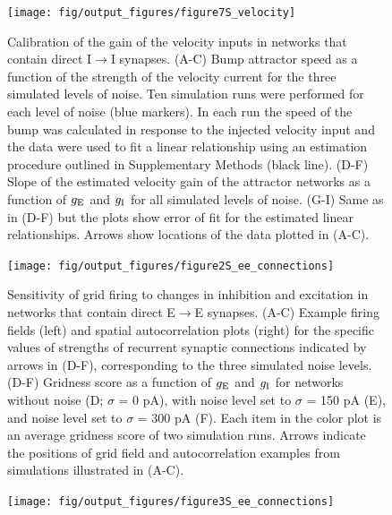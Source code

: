 \documentclass[a4paper,12pt]{article}
\newcommand{\ssc}[3]{\ensuremath{#1_{\text{#2}_{\text{#3}}}}}
\newcommand{\gE      }{\ssc{g}      {\scriptsize{E}}{}}
\newcommand{\gI      }{\ssc{g}      {\scriptsize{I}}{}}
\begin{document}
\clearpage

\begin{figure}[ht!]
    \internallinenumbers
    \centering
        \texttt{[image: fig/output\_figures/figure7S\_velocity]}
    \caption{Calibration of the gain of the velocity inputs in networks that
    contain direct I$\rightarrow$I synapses. (A-C) Bump attractor speed as a
    function of the strength of the velocity current for the three simulated
    levels of noise. Ten simulation runs were performed for each level of noise
    (blue markers). In each run the speed of the bump was calculated in
    response to the injected velocity input and the data were used to fit a
    linear relationship using an estimation procedure outlined in Supplementary
    Methods (black line). (D-F) Slope of the estimated velocity gain of the
    attractor networks as a function of $\gE$ and $\gI$ for all simulated
    levels of noise. (G-I) Same as in (D-F) but the plots show error of fit for
    the estimated linear relationships. Arrows show locations of the data
    plotted in (A-C).}
\end{figure}

\clearpage

\begin{figure}[p]
    \internallinenumbers
    \centering
        \texttt{[image: fig/output\_figures/figure2S\_ee\_connections]}
    \caption{Sensitivity of grid firing to changes in inhibition and excitation
    in networks that contain direct E$\rightarrow$E synapses. (A-C) Example
    firing fields (left) and spatial autocorrelation plots (right) for the
    specific values of strengths of recurrent synaptic connections indicated by
    arrows in (D-F), corresponding to the three simulated noise levels.  (D-F)
    Gridness score as a function of $\gE$ and $\gI$ for networks without noise (D;
    $\sigma$ = 0 pA), with noise level set to $\sigma$ = 150 pA (E), and noise
    level set to $\sigma$ = 300 pA (F). Each item in the color plot is an
    average gridness score of two simulation runs. Arrows indicate the
    positions of grid field and autocorrelation examples from simulations
    illustrated in (A-C).}
\end{figure}

\clearpage

\begin{figure}[p]
    \internallinenumbers
    \centering
        \texttt{[image: fig/output\_figures/figure3S\_ee\_connections]}
\end{figure}
\end{document}
